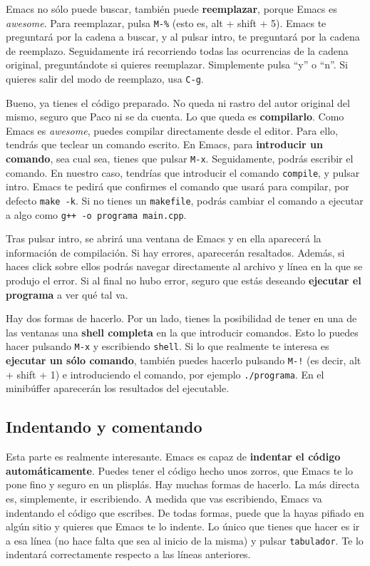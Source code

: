 \documentclass[landscape]{article}
\begin{document}
\begin{multicols*}{2}
Emacs no sólo puede buscar, también puede \textbf{reemplazar}, porque Emacs es \textit{awesome}. Para reemplazar, pulsa \texttt{M-\%} (esto es, alt + shift + 5). Emacs te preguntará por la cadena a buscar, y al pulsar intro, te preguntará por la cadena de reemplazo. Seguidamente irá recorriendo todas las ocurrencias de la cadena original, preguntándote si quieres reemplazar. Simplemente pulsa ``y'' o ``n''. Si quieres salir del modo de reemplazo, usa \texttt{C-g}.

Bueno, ya tienes el código preparado. No queda ni rastro del autor original del mismo, seguro que Paco ni se da cuenta. Lo que queda es \textbf{compilarlo}. Como Emacs es \textit{awesome}, puedes compilar directamente desde el editor. Para ello, tendrás que teclear un comando escrito. En Emacs, para \textbf{introducir un comando}, sea cual sea, tienes que pulsar \texttt{M-x}. Seguidamente, podrás escribir el comando. En nuestro caso, tendrías que introducir el comando \texttt{compile}, y pulsar intro. Emacs te pedirá que confirmes el comando que usará para compilar, por defecto \texttt{make -k}. Si no tienes un \texttt{makefile}, podrás cambiar el comando a ejecutar a algo como \texttt{g++ -o programa main.cpp}.

Tras pulsar intro, se abrirá una ventana de Emacs y en ella aparecerá la información de compilación. Si hay errores, aparecerán resaltados. Además, si haces click sobre ellos podrás navegar directamente al archivo y línea en la que se produjo el error. Si al final no hubo error, seguro que estás deseando \textbf{ejecutar el programa} a ver qué tal va. 

Hay dos formas de hacerlo. Por un lado, tienes la posibilidad de tener en una de las ventanas una \textbf{shell completa} en la que introducir comandos. Esto lo puedes hacer pulsando \texttt{M-x} y escribiendo \texttt{shell}. Si lo que realmente te interesa es \textbf{ejecutar un sólo comando}, también puedes hacerlo pulsando \texttt{M-!} (es decir, alt + shift + 1) e introduciendo el comando, por ejemplo \texttt{./programa}. En el minibúffer aparecerán los resultados del ejecutable.

\subsection*{Indentando y comentando}
\vspace{-0.4cm}
Esta parte es realmente interesante. Emacs es capaz de \textbf{indentar el código automáticamente}. Puedes tener el código hecho unos zorros, que Emacs te lo pone fino y seguro en un plisplás. Hay muchas formas de hacerlo. La más directa es, simplemente, ir escribiendo. A medida que vas escribiendo, Emacs va indentando el código que escribes. De todas formas, puede que la hayas pifiado en algún sitio y quieres que Emacs te lo indente. Lo único que tienes que hacer es ir a esa línea (no hace falta que sea al inicio de la misma) y pulsar \texttt{tabulador}. Te lo indentará correctamente respecto a las líneas anteriores.


\end{multicols*}
\end{document}
